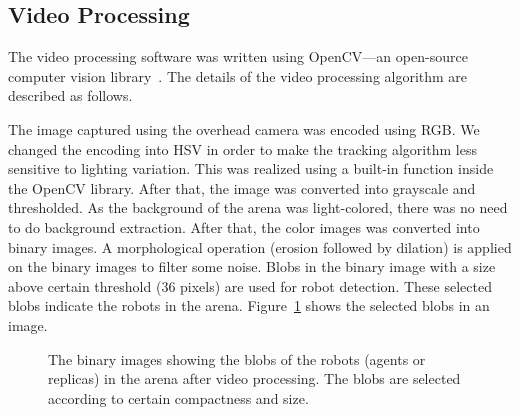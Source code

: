 \subsection{Video Processing}\label{sec:video_processing_physical_swarm}

The video processing software was written using OpenCV---an open-source computer vision library~\cite{Gary2008}. The details of the video processing algorithm are described as follows. 

The image captured using the overhead camera was encoded using RGB. We changed the encoding into HSV in order to make the tracking algorithm less sensitive to lighting variation. This was realized using a built-in function inside the OpenCV library. After that, the image was converted into grayscale and thresholded. As the background of the arena was light-colored, there was no need to do background extraction. After that, the color images was converted into binary images. A morphological operation (erosion followed by dilation) is applied on the binary images to filter some noise. Blobs in the binary image with a size above certain threshold (36 pixels) are used for robot detection. These selected blobs indicate the robots in the arena. Figure~\ref{fig:binary_image_individuals} shows the selected blobs in an image. 
%
\begin{figure}[!t]%
	\centering
		\caption{The binary images showing the blobs of the robots (agents or replicas) in the arena after video processing. The blobs are selected according to certain compactness and size.}
		\label{fig:binary_image_individuals}
\end{figure}
%

